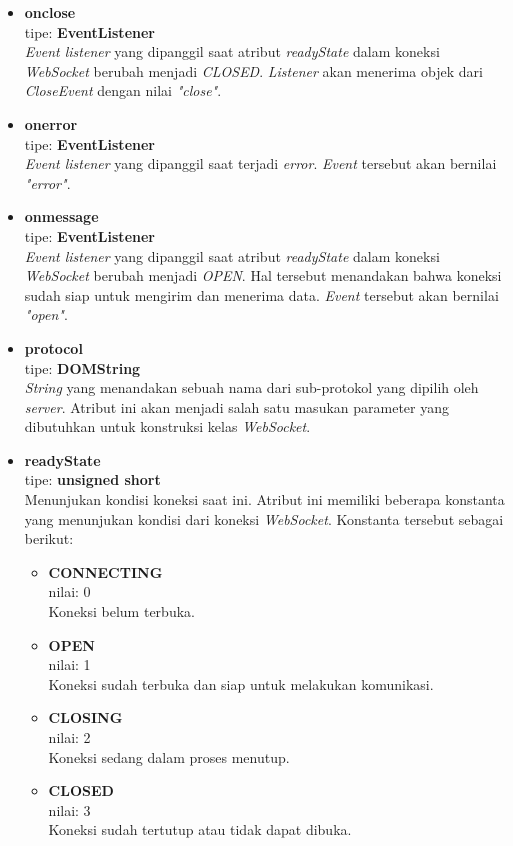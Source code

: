 \documentclass[a4paper,twoside]{article}
\begin{document}
\begin{enumerate}
\begin{enumerate}
\begin{itemize}
				\item \textbf{onclose} \\ tipe: \textbf{EventListener} \\ \textit{Event listener} yang dipanggil saat atribut \textit{readyState} dalam koneksi \textit{WebSocket} berubah menjadi \textit{CLOSED}. \textit{Listener} akan menerima objek dari \textit{CloseEvent} dengan nilai \textit{"close"}.
				
				\item \textbf{onerror} \\ tipe: \textbf{EventListener} \\ \textit{Event listener} yang dipanggil saat terjadi \textit{error}. \textit{Event} tersebut akan bernilai \textit{"error"}.
				
				\item \textbf{onmessage} \\ tipe: \textbf{EventListener} \\ \textit{Event listener} yang dipanggil saat atribut \textit{readyState} dalam koneksi \textit{WebSocket} berubah menjadi \textit{OPEN}. Hal tersebut menandakan bahwa koneksi sudah siap untuk mengirim dan menerima data. \textit{Event} tersebut akan bernilai \textit{"open"}.
				
				\item \textbf{protocol} \\ tipe: \textbf{DOMString} \\ \textit{String} yang menandakan sebuah nama dari sub-protokol yang dipilih oleh \textit{server}. Atribut ini akan menjadi salah satu masukan parameter yang dibutuhkan untuk konstruksi kelas \textit{WebSocket}.
				
				\item \textbf{readyState} \\ tipe: \textbf{unsigned short} \\ Menunjukan kondisi koneksi saat ini. Atribut ini memiliki beberapa konstanta yang menunjukan kondisi dari koneksi \textit{WebSocket}. Konstanta tersebut sebagai berikut:
				\begin{itemize}
					\item \textbf{CONNECTING} \\ nilai: 0 \\ Koneksi belum terbuka.
					\item \textbf{OPEN} \\ nilai: 1 \\ Koneksi sudah terbuka dan siap untuk melakukan komunikasi.
					\item \textbf{CLOSING} \\ nilai: 2 \\ Koneksi sedang dalam proses menutup.
					\item \textbf{CLOSED} \\ nilai: 3 \\ Koneksi sudah tertutup atau tidak dapat dibuka.
				\end{itemize}
				

\end{itemize}
\end{enumerate}
\end{enumerate}
\end{document}
